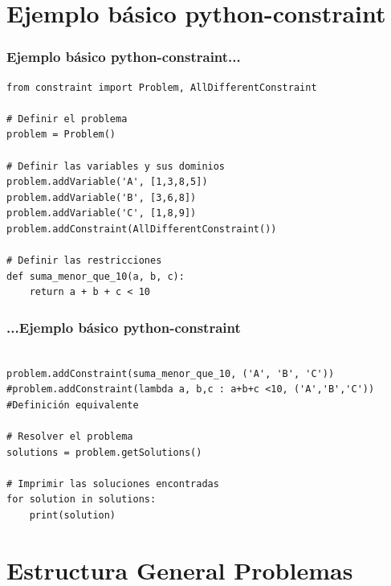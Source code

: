 \documentclass[xcolor=table]{beamer}
\begin{document}

\section{Ejemplo básico python-constraint}

\begin{frame} [fragile]\frametitle{Ejemplo básico python-constraint...}  \footnotesize  

\begin{verbatim}
from constraint import Problem, AllDifferentConstraint

# Definir el problema
problem = Problem()

# Definir las variables y sus dominios
problem.addVariable('A', [1,3,8,5])
problem.addVariable('B', [3,6,8])
problem.addVariable('C', [1,8,9])
problem.addConstraint(AllDifferentConstraint())

# Definir las restricciones
def suma_menor_que_10(a, b, c):
    return a + b + c < 10

\end{verbatim}
\end{frame} 


\begin{frame} [fragile]\frametitle{...Ejemplo básico python-constraint}  \footnotesize  

\begin{verbatim}

problem.addConstraint(suma_menor_que_10, ('A', 'B', 'C'))
#problem.addConstraint(lambda a, b,c : a+b+c <10, ('A','B','C')) #Definición equivalente

# Resolver el problema
solutions = problem.getSolutions()

# Imprimir las soluciones encontradas
for solution in solutions:
    print(solution)
\end{verbatim}
\end{frame} 

\section{Estructura General Problemas}
\end{document}
